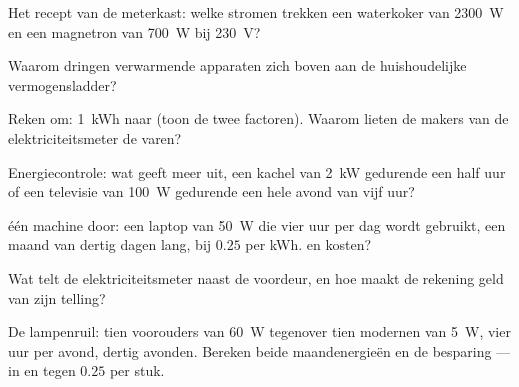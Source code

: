 \begin{exercise}[$\star$]\label{exo:g9:electric-power-energy:3}
Het recept van de meterkast: welke stromen trekken een waterkoker van
\qty{2300}{W} en een magnetron van \qty{700}{W} bij \qty{230}{V}?
\end{exercise}

\begin{exercise}[$\star$]\label{exo:g9:electric-power-energy:4}
Waarom dringen verwarmende apparaten zich boven aan de huishoudelijke
vermogensladder?
\end{exercise}

\begin{exercise}[$\star$]\label{exo:g9:electric-power-energy:5}
Reken om: \qty{1}{kWh} naar  (toon de twee factoren).
Waarom lieten de makers van de elektriciteitsmeter de  varen?
\end{exercise}

\begin{exercise}[$\star$]\label{exo:g9:electric-power-energy:6}
Energiecontrole: wat geeft meer uit, een kachel van \qty{2}{kW}
gedurende een half uur of een televisie van \qty{100}{W} gedurende een
hele avond van vijf uur?
\end{exercise}

\begin{exercise}[$\star$]\label{exo:g9:electric-power-energy:7}
 één machine door: een laptop van \qty{50}{W} die vier
uur per dag wordt gebruikt, een maand van dertig dagen lang, bij
$0.25$ per \unit{kWh}.  en kosten?
\end{exercise}

\begin{exercise}[$\star$]\label{exo:g9:electric-power-energy:8}
Wat telt de elektriciteitsmeter naast de voordeur, en hoe maakt de rekening geld van
zijn telling?
\end{exercise}

\begin{exercise}[$\star\star$]\label{exo:g9:electric-power-energy:9}
De lampenruil: tien voorouders van \qty{60}{W} tegenover tien modernen
van \qty{5}{W}, vier uur per avond, dertig avonden. Bereken beide
maandenergieën en de besparing --- in  en tegen
$0.25$ per stuk.
\end{exercise}

